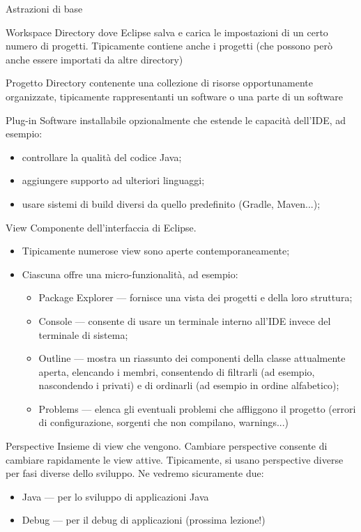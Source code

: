 \documentclass[presentation]{beamer}
\begin{document}
\begin{frame}[allowframebreaks]{Astrazioni di base}
	\begin{block}{Workspace}
		Directory dove Eclipse salva e carica le impostazioni di un certo numero di progetti. Tipicamente contiene anche i progetti (che possono però anche essere importati da altre directory)
	\end{block}
	\begin{block}{Progetto}
		Directory contenente una collezione di risorse opportunamente organizzate, tipicamente rappresentanti un software o una parte di un software
	\end{block}
	\begin{block}{Plug-in}
		Software installabile opzionalmente che estende le capacità dell'IDE, ad esempio:
		\begin{itemize}
			\item controllare la qualità del codice Java;
			\item aggiungere supporto ad ulteriori linguaggi;
			\item usare sistemi di build diversi da quello predefinito (Gradle, Maven...);
		\end{itemize}
	\end{block}
	\begin{block}{View}
		Componente dell'interfaccia di Eclipse.
		\begin{itemize}
			\item Tipicamente numerose view sono aperte contemporaneamente;
			\item Ciascuna offre una micro-funzionalità, ad esempio:
			\begin{itemize}
				\item Package Explorer --- fornisce una vista dei progetti e della loro struttura;
				\item Console --- consente di usare un terminale interno all'IDE invece del terminale di sistema;
				\item Outline --- mostra un riassunto dei componenti della classe attualmente aperta, elencando i membri, consentendo di filtrarli (ad esempio, nascondendo i privati) e di ordinarli (ad esempio in ordine alfabetico);
				\item Problems --- elenca gli eventuali problemi che affliggono il progetto (errori 
di configurazione, sorgenti che non compilano, warnings...)
			\end{itemize}
		\end{itemize}
	\end{block}
	\begin{block}{Perspective}
		Insieme di view che vengono. Cambiare perspective consente di cambiare rapidamente le view attive. Tipicamente, si usano perspective diverse per fasi diverse dello sviluppo. Ne vedremo sicuramente due:
		\begin{itemize}
			\item Java --- per lo sviluppo di applicazioni Java
			\item Debug --- per il debug di applicazioni (prossima lezione!)
		\end{itemize}
	\end{block}
\end{frame}
\end{document}
